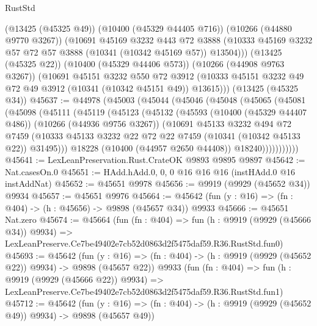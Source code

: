 \begin{lexlean}{RustStd}
\begin{coremodule}
        (@13425 (@45325 @49))
        (@10400 (@45329 @44405 @716))
        (@10266 (@44880 @9770 @3267))
        (@10691
          @45169
          @3232
          @443
          @72
          @3888
          (@10333 @45169 @3232 @57 @72 @57 @3888 (@10341 (@10342 @45169 @57)) @13504)))
      (@13425 (@45325 @22))
      (@10400 (@45329 @44406 @573))
      (@10266 (@44908 @9763 @3267))
      (@10691
        @45151
        @3232
        @550
        @72
        @3912
        (@10333 @45151 @3232 @49 @72 @49 @3912 (@10341 (@10342 @45151 @49)) @13615)))
    (@13425 (@45325 @34))
@45637 := @44978
    (@45003
      (@45044
        (@45046
          (@45048
            (@45065
              (@45081
                (@45098
                  (@45111
                    (@45119
                      (@45123
                        (@45132
                          (@45593
                            (@10400 (@45329 @44407 @486))
                            (@10266 (@44936 @9756 @3267))
                            (@10691
                              @45133
                              @3232
                              @494
                              @72
                              @7459
                              (@10333
                                @45133
                                @3232
                                @22
                                @72
                                @22
                                @7459
                                (@10341 (@10342 @45133 @22))
                                @31495)))
                          @18228
                          (@10400 (@44957 @2650 @44408))
                          @18240)))))))))))
@45641 := LexLeanPreservation.Rust.CrateOK @9893 @9895 @9897
@45642 := Nat.casesOn.{0}
@45651 := HAdd.hAdd.{0, 0, 0} @16 @16 @16 (instHAdd.{0} @16 instAddNat)
@45652 := @45651 @9978
@45656 := @9919 (@9929 (@45652 @34)) @9934
@45657 := @45651 @9976
@45664 := @45642 (fun (y : @16) => (fn : @404) -> (h : @45656) -> @9898 (@45657 @34)) @9933
@45666 := @45651 Nat.zero
@45674 := @45664
    (fun (fn : @404) =>
    fun (h : @9919 (@9929 (@45666 @34)) @9934) =>
    LexLeanPreserve.Ce7be49402e7cb52d0863d2f5475daf59.R36.RustStd.fun0)
@45693 := @45642
    (fun (y : @16) => (fn : @404) -> (h : @9919 (@9929 (@45652 @22)) @9934) -> @9898 (@45657 @22))
    @9933
    (fun (fn : @404) =>
    fun (h : @9919 (@9929 (@45666 @22)) @9934) =>
    LexLeanPreserve.Ce7be49402e7cb52d0863d2f5475daf59.R36.RustStd.fun1)
@45712 := @45642
    (fun (y : @16) => (fn : @404) -> (h : @9919 (@9929 (@45652 @49)) @9934) -> @9898 (@45657 @49))

\end{coremodule}
\end{lexlean}
